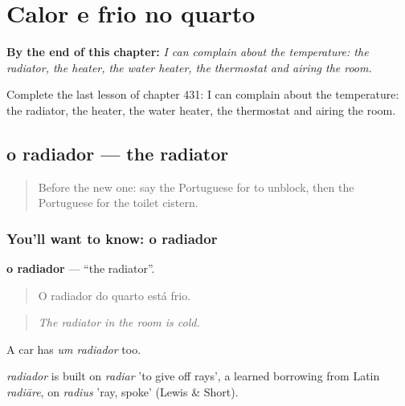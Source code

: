 
\chapter{Calor e frio no quarto}
\label{ch:pt-calor-e-frio-no-quarto}

\begin{chapteropening}
\textbf{By the end of this chapter:} \emph{I can complain about the temperature: the radiator, the heater, the water heater, the thermostat and airing the room.}

Complete the last lesson of chapter 431: I can complain about the temperature: the radiator, the heater, the water heater, the thermostat and airing the room.
\end{chapteropening}

\section[o radiador]{o radiador — the radiator}

\label{lesson:PT-C431-radiador}



\begin{quote}
Before the new one: say the Portuguese for to unblock, then the Portuguese for the toilet cistern.
\end{quote}

\subsection*{You'll want to know: o radiador}
\textbf{o radiador} — \textquotedblleft{}the radiator\textquotedblright{}.

\begin{quote}
O radiador do quarto está frio.
\end{quote}

\begin{quote}
\emph{The radiator in the room is cold.}
\end{quote}

A car has \emph{um radiador} too.

\begin{cousinweb}
\emph{radiador} is built on \emph{radiar} 'to give off rays', a learned borrowing from Latin \emph{radiāre}, on \emph{radius} 'ray, spoke' (Lewis \& Short).
\end{cousinweb}

